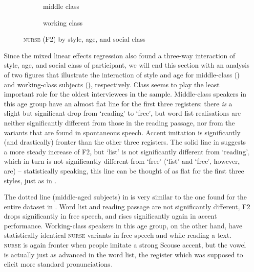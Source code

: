 \begin{figure}
	
	\begin{subfigure}{.49\textwidth}
		
			\resizebox{\linewidth}{!}{} 
		\caption{middle class}
		\label{fig.line.f2.nurse.mc}
	\end{subfigure}
	\begin{subfigure}{.49\textwidth}
		
			\resizebox{\linewidth}{!}{} 
		\caption{working class}
		\label{fig.line.f2.nurse.wc}
	\end{subfigure}
	\caption{\textsc{nurse} (F2) by style, age, and social class}
\end{figure}

Since the mixed linear effects regression also found a three-way interaction of style, age, and social class of participant, we will end this section with an analysis of two figures that illustrate the interaction of style and age for middle-class () and working-class subjects (), respectively.
Class seems to play the least important role for the oldest interviewees in the sample.
Middle-class speakers in this age group have an almost flat line for the first three registers: there \emph{is} a slight but significant drop from `reading' to `free', but word list realisations are neither significantly different from those in the reading passage, nor from the variants that are found in spontaneous speech.
Accent imitation is significantly (and drastically) fronter than the other three registers.
The solid line in  suggests a more steady increase of F2, but `list' is not significantly different from `reading', which in turn is not significantly different from `free' (`list' and `free', however, are) -- statistically speaking, this line can be thought of as flat for the first three styles, just as in .

The dotted line (middle-aged subjects) in  is very similar to the one found for the entire dataset in .
Word list and reading passage are not significantly different, F2 drops significantly in free speech, and rises significantly again in accent performance.
Working-class speakers in this age group, on the other hand, have statistically identical \textsc{nurse} variants in free speech and while reading a text.
\textsc{nurse} is again fronter when people imitate a strong Scouse accent, but the vowel is actually just as advanced in the word list, the register which was supposed to elicit more standard pronunciations.


